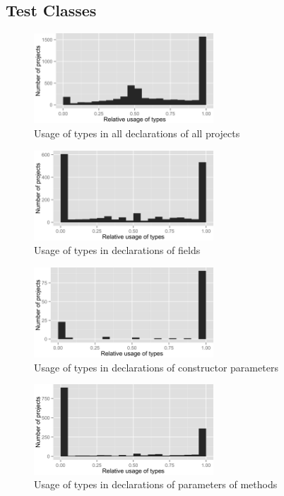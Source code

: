 \subsection*{Test Classes}
\begin{figure}[h]
\centering 
\includegraphics[width=0.6\textwidth]{../aosd_2014/analysis/result/test/test/histograms/5_all.png} 
\caption{Usage of types in all declarations of all projects}
\end{figure}

\begin{figure}[h]
\centering 
\includegraphics[width=0.6\textwidth]{../aosd_2014/analysis/result/test/test/histograms/10_Field.png} 
\caption{Usage of types in declarations of fields}
\end{figure}

\begin{figure}[h]
\centering 
\includegraphics[width=0.6\textwidth]{../aosd_2014/analysis/result/test/test/histograms/9_Constructor_Parameter.png} 
\caption{Usage of types in declarations of constructor parameters}
\end{figure}

\begin{figure}[h]
\centering 
\includegraphics[width=0.6\textwidth]{../aosd_2014/analysis/result/test/test/histograms/8_Method_Parameter.png} 
\caption{Usage of types in declarations of parameters of methods}
\end{figure}

